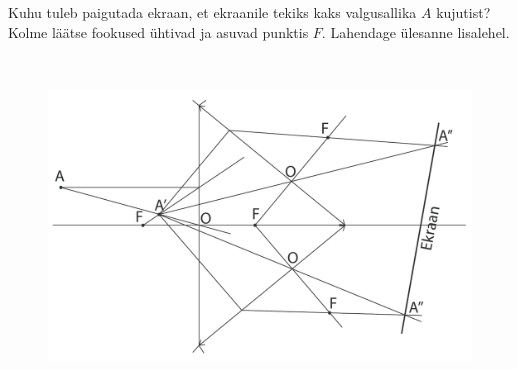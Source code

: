 
Kuhu tuleb paigutada ekraan, et ekraanile tekiks kaks valgusallika $A$ kujutist? Kolme läätse fookused ühtivad ja asuvad punktis $F$. Lahendage ülesanne lisalehel.



\hint

\solu
\

\begin{figure}[h]
    \centering
    \includegraphics[scale=0.5]{2022-v3g-04-sol.pdf}
\end{figure}
\probend